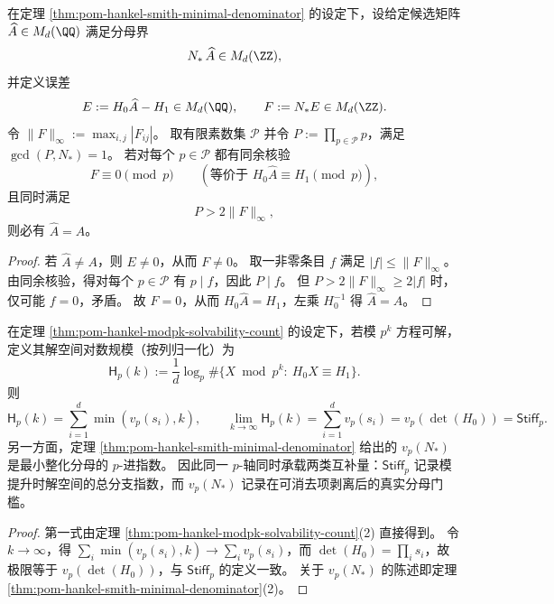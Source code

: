 \begin{theorem}\label{thm:pom-hankel-deterministic-mod-audit-threshold}
在定理 \ref{thm:pom-hankel-smith-minimal-denominator} 的设定下，设给定候选矩阵 \(\widehat A\in M_d(\QQ)\) 满足分母界
\[
N_\ast\,\widehat A\in M_d(\ZZ),
\]
并定义误差
\[
E:=H_0\widehat A-H_1\in M_d(\QQ),
\qquad
F:=N_\ast E\in M_d(\ZZ).
\]
令 \(\|F\|_\infty:=\max_{i,j}|F_{ij}|\)。
取有限素数集 \(\mathcal P\) 并令 \(P:=\prod_{p\in\mathcal P}p\)，满足 \(\gcd(P,N_\ast)=1\)。
若对每个 \(p\in\mathcal P\) 都有同余核验
\[
F\equiv 0\pmod p
\qquad(\text{等价于 }H_0\widehat A\equiv H_1\pmod p),
\]
且同时满足
\[
P>2\|F\|_\infty,
\]
则必有 \(\widehat A=A\)。
\end{theorem}
\begin{proof}
若 \(\widehat A\neq A\)，则 \(E\neq 0\)，从而 \(F\neq 0\)。
取一非零条目 \(f\) 满足 \(|f|\le \|F\|_\infty\)。
由同余核验，得对每个 \(p\in\mathcal P\) 有 \(p\mid f\)，因此 \(P\mid f\)。
但 \(P>2\|F\|_\infty\ge 2|f|\) 时，仅可能 \(f=0\)，矛盾。
故 \(F=0\)，从而 \(H_0\widehat A=H_1\)，左乘 \(H_0^{-1}\) 得 \(\widehat A=A\)。
\end{proof}

\begin{proposition}\label{prop:pom-hankel-stiffness-entropy-decomposition}
在定理 \ref{thm:pom-hankel-modpk-solvability-count} 的设定下，若模 \(p^k\) 方程可解，定义其解空间对数规模（按列归一化）为
\[
\mathsf H_p(k):=\frac{1}{d}\log_p\#\{X\bmod p^k:\ H_0X\equiv H_1\}.
\]
则
\[
\mathsf H_p(k)=\sum_{i=1}^{d}\min(v_p(s_i),k),
\qquad
\lim_{k\to\infty}\mathsf H_p(k)=\sum_{i=1}^{d}v_p(s_i)=v_p(\det(H_0))=\mathsf{Stiff}_p.
\]
另一方面，定理 \ref{thm:pom-hankel-smith-minimal-denominator} 给出的 \(v_p(N_\ast)\) 是最小整化分母的 \(p\)-进指数。
因此同一 \(p\)-轴同时承载两类互补量：\(\mathsf{Stiff}_p\) 记录模提升时解空间的总分支指数，而 \(v_p(N_\ast)\) 记录在可消去项剥离后的真实分母门槛。
\end{proposition}
\begin{proof}
第一式由定理 \ref{thm:pom-hankel-modpk-solvability-count}(2) 直接得到。
令 \(k\to\infty\)，得 \(\sum_i \min(v_p(s_i),k)\to \sum_i v_p(s_i)\)，而 \(\det(H_0)=\prod_i s_i\)，故极限等于 \(v_p(\det(H_0))\)，与 \(\mathsf{Stiff}_p\) 的定义一致。
关于 \(v_p(N_\ast)\) 的陈述即定理 \ref{thm:pom-hankel-smith-minimal-denominator}(2)。
\end{proof}

